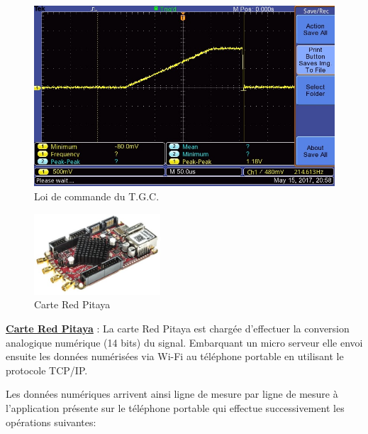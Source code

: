 \documentclass[12pt]{article}
\begin{document}
\begin{figure}[!h]
  \centering
  \includegraphics[width=12cm,trim=0cm 0cm 0cm 0cm, clip=true]{Images_Rapport/tgc}
  
  
  \caption{Loi de commande du T.G.C.}
  
\end{figure}
\vspace{20pt}


\begin{figure}
  \vspace{-50pt}
  \hspace{-0pt}
  \begin{center}
    \includegraphics[width=0.42\textwidth]{Images_Rapport/redpitaya}
  \end{center}
  \vspace{-5pt}
  \caption{Carte Red Pitaya}
  \vspace{-10pt}
\end{figure}
\textbf{\underline{Carte Red Pitaya}} : La carte Red Pitaya est chargée d'effectuer la conversion analogique numérique (14 bits) du signal. Embarquant un micro serveur elle envoi ensuite les données numérisées via Wi-Fi au téléphone portable en utilisant le protocole TCP/IP.\par 

\newpage

Les données numériques arrivent ainsi ligne de mesure par ligne de mesure à l'application présente sur le téléphone portable qui effectue successivement les opérations suivantes:\par
\end{document}
